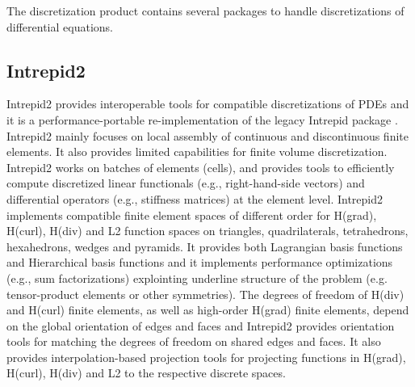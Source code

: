 The discretization product contains several packages to handle discretizations of differential equations.

\subsection{Intrepid2}
Intrepid2 provides interoperable tools for compatible discretizations of PDEs and it is a performance-portable re-implementation of the legacy Intrepid package \cite{bochev2012}. Intrepid2 mainly focuses on local assembly of continuous and discontinuous finite elements. It also provides limited capabilities for finite volume discretization.  Intrepid2 works on batches of elements (cells), and provides tools to efficiently compute discretized linear functionals (e.g., right-hand-side vectors) and differential operators (e.g., stiffness matrices) at the element level. Intrepid2 implements compatible finite element spaces of different order for H(grad), H(curl), H(div) and L2 function spaces on triangles, quadrilaterals, tetrahedrons, hexahedrons, wedges and pyramids. It provides both Lagrangian basis functions and Hierarchical basis functions \cite{fuentes2015} and it implements performance optimizations (e.g., sum factorizations) explointing underline structure of the problem (e.g. tensor-product elements or other symmetries).  The degrees of freedom of H(div) and H(curl) finite elements, as well as high-order H(grad) finite elements, depend on the global orientation of edges and faces and Intrepid2 provides orientation tools for matching the degrees of freedom on shared edges and faces. It also provides interpolation-based projection tools for projecting functions in H(grad), H(curl), H(div) and L2 to the respective discrete spaces.  
